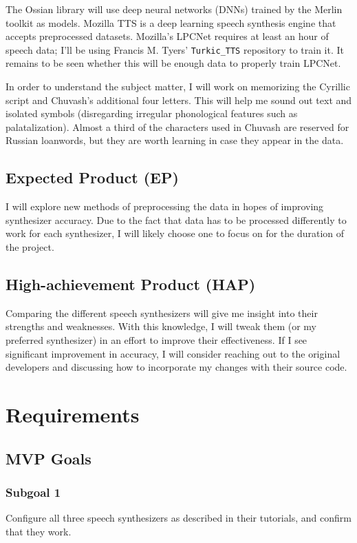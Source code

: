 \documentclass[fleqn,10pt]{SelfArx} %
\begin{document}
The Ossian library will use deep neural networks (DNNs) trained by the Merlin toolkit as models. Mozilla TTS is a deep learning speech synthesis engine that accepts preprocessed datasets. Mozilla's LPCNet requires at least an hour of speech data; I'll be using Francis M. Tyers' \texttt{Turkic\_TTS} repository to train it. It remains to be seen whether this will be enough data to properly train LPCNet.

In order to understand the subject matter, I will work on memorizing the Cyrillic script and Chuvash's additional four letters. This will help me sound out text and isolated symbols (disregarding irregular phonological features such as palatalization). Almost a third of the characters used in Chuvash are reserved for Russian loanwords, but they are worth learning in case they appear in the data.

\subsection{Expected Product (EP)}
I will explore new methods of preprocessing the data in hopes of improving synthesizer accuracy. Due to the fact that data has to be processed differently to work for each synthesizer, I will likely choose one to focus on for the duration of the project.

\subsection{High-achievement Product (HAP)}
Comparing the different speech synthesizers will give me insight into their strengths and weaknesses. With this knowledge, I will tweak them (or my preferred synthesizer) in an effort to improve their effectiveness. If I see significant improvement in accuracy, I will consider reaching out to the original developers and discussing how to incorporate my changes with their source code.


\section{Requirements}
\subsection{MVP Goals}
\subsubsection{Subgoal 1}
Configure all three speech synthesizers as described in their tutorials, and confirm that they work.
\end{document}
